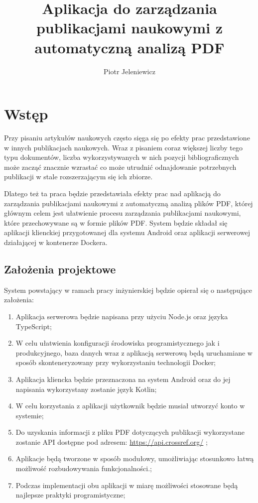 \documentclass[a4paper,12pt,twoside,openany]{report}
\title{Aplikacja do zarządzania publikacjami naukowymi z automatyczną analizą PDF}
\author{Piotr Jeleniewicz}
\begin{document}
\maketitle

\chapter{Wstęp}
Przy pisaniu artykułów naukowych często sięga się po efekty prac przedstawione w innych publikacjach naukowych. Wraz z pisaniem coraz większej liczby tego typu dokumentów, liczba wykorzystywanych w nich pozycji bibliograficznych może zacząć znacznie wzrastać co może utrudnić odnajdowanie potrzebnych publikacji w stale rozszerzającym się ich zbiorze. 

Dlatego też ta praca będzie przedstawiała efekty prac nad aplikacją do zarządzania publikacjami naukowymi z automatyczną analizą plików PDF, której głównym celem jest ułatwienie procesu zarządzania publikacjami naukowymi, które przechowywane są w formie plików PDF. System będzie składał się aplikacji klienckiej przygotowanej dla systemu Android oraz aplikacji serwerowej działającej w kontenerze Dockera.
\section{Założenia projektowe}

\hspace{10pt} 	System powstający w ramach pracy inżynierskiej będzie opierał się o następujące założenia: 	
\begin{enumerate}
	\item Aplikacja serwerowa będzie napisana przy użyciu Node.js oraz języka TypeScript;
	\item W celu ułatwienia konfiguracji środowiska programistycznego jak i produkcyjnego, baza danych wraz z aplikacją serwerową będą uruchamiane w sposób skonteneryzowany przy wykorzystaniu technologii Docker;
	\item Aplikacja kliencka będzie przeznaczona na system Android oraz do jej napisania wykorzystany zostanie język Kotlin;
	\item W celu korzystania z aplikacji użytkownik będzie musiał utworzyć konto w systemie;
	\item Do uzyskania informacji z pliku PDF dotyczących publikacji wykorzystane zostanie API dostępne pod adresem: \newline \url{https://api.crossref.org/} ;
	\item Aplikacje będą tworzone w sposób modułowy, umożliwiając stosunkowo łatwą możliwość rozbudowywania funkcjonalności.;
	\item Podczas implementacji obu aplikacji w miarę możliwości stosowane będą najlepsze praktyki programistyczne;
\end{enumerate}
\end{document}
